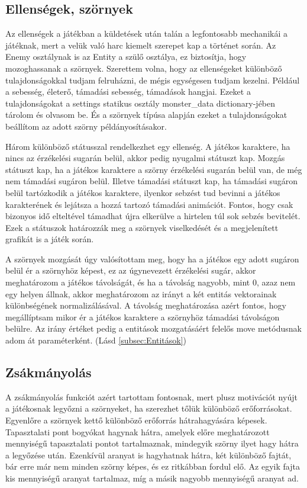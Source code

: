 \subsection{Ellenségek, szörnyek}

 Az ellenségek a játékban a küldetések után talán a legfontosabb mechanikái a játéknak, mert a velük való harc kiemelt szerepet kap a történet során.
Az Enemy osztálynak is az Entity a szülő osztálya, ez biztosítja, hogy mozoghassanak a szörnyek. Szerettem volna, hogy az ellenségeket különböző tulajdonságokkal tudjam felruházni, de mégis egységesen tudjam kezelni. Például a sebesség, életerő, támadási sebesség, támadások hangjai. Ezeket a tulajdonságokat a settings statikus osztály monster\_data dictionary-jében tárolom és olvasom be. És a szörnyek típúsa alapján ezeket a tulajdonságokat beállítom az adott szörny példányosításakor.

Három különböző státusszal rendelkezhet egy ellenség. A játékos karaktere, ha nincs az érzékelési sugarán belül, akkor pedig nyugalmi státuszt kap. Mozgás státuszt kap, ha a játékos karaktere a szörny érzékelési sugarán belül van, de még nem támadási sugáron belül.  Illetve támadási státuszt kap, ha támadási sugáron belül tartózkodik a játékos karaktere, ilyenkor sebzést tud bevinni a játékos karakterének és lejátsza a hozzá tartozó támadási animációt. Fontos, hogy csak bizonyos idő elteltével támadhat újra elkerülve a hirtelen túl sok sebzés bevitelét. Ezek a státuszok határozzák meg a szörnyek viselkedését és a megjelenített grafikát is a játék során.

A szörnyek mozgását úgy valósítottam meg, hogy ha a játékos egy adott sugáron belül ér a szörnyhöz képest,
 ez az úgynevezett érzékelési sugár, akkor meghatározom a játékos távolságát, 
 és ha a távolság nagyobb, mint 0, azaz nem egy helyen állnak, akkor meghatározom az irányt a két entitás vektorainak különbségének normalizálásával.
  A távolság meghatározása azért fontos, hogy megállíptsam mikor ér a játékos karaktere a szörnyhöz támadási távolságon belülre.
  Az irány értéket pedig a entitások mozgatásáért felelős move metódusnak adom át paraméterként. (Lásd \ref{subsec:Entitások})



\subsection{Zsákmányolás}
 A zsákmányolás funkciót azért tartottam fontosnak, mert plusz motivációt nyújt a játékosnak legyőzni a szörnyeket, ha szerezhet tőlük különböző erőforrásokat. Egyenlőre a szörnyek kettő különböző erőforrás hátrahagyására képesek. Tapasztalati pont bogyókat hagynak hátra, amelyek előre meghatározott mennyiségű tapasztalati pontot tartalmaznak, mindegyik szörny ilyet hagy hátra a legyőzése után. Ezenkívül aranyat is hagyhatnak hátra, két különböző fajtát, bár erre már nem minden szörny képes, és ez ritkábban fordul elő. Az egyik fajta kis mennyiségű aranyat tartalmaz, míg a másik nagyobb mennyiségű aranyat ad. 

